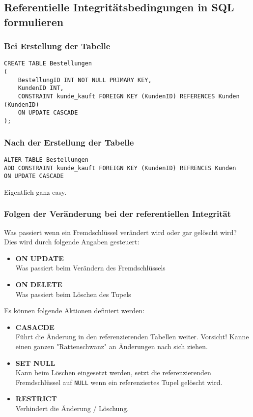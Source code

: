 \subsection{Referentielle Integritätsbedingungen in SQL formulieren}

\subsubsection{Bei Erstellung der Tabelle}
\begin{lstlisting}[caption={Referentielle Integrität bei Erstellung}]
CREATE TABLE Bestellungen
(
    BestellungID INT NOT NULL PRIMARY KEY,
    KundenID INT,
    CONSTRAINT kunde_kauft FOREIGN KEY (KundenID) REFERENCES Kunden (KundenID)
    ON UPDATE CASCADE
);
\end{lstlisting}

\subsubsection{Nach der Erstellung der Tabelle}
\begin{lstlisting}[caption={Referentielle Integrität Update}]
ALTER TABLE Bestellungen
ADD CONSTRAINT kunde_kauft FOREIGN KEY (KundenID) REFRENCES Kunden
ON UPDATE CASCADE
\end{lstlisting}

Eigentlich ganz easy.

\subsubsection{Folgen der Veränderung bei der referentiellen Integrität}
Was passiert wenn ein Fremdschlüssel verändert wird oder gar gelöscht wird? Dies wird durch folgende Angaben gesteuert:

\begin{itemize}
  \item \textbf{ON UPDATE} \\
  Was passiert beim Verändern des Fremdschlüssels
  \item \textbf{ON DELETE} \\
  Was passiert beim Löschen des Tupels
\end{itemize}

\noindent
Es können folgende Aktionen definiert werden:

\begin{itemize}
  \item \textbf{CASACDE} \\
  Führt die Änderung in den referenzierenden Tabellen weiter. Vorsicht! Kanne einen ganzen "Rattenschwanz" an Änderungen nach sich ziehen.
  \item \textbf{SET NULL} \\
  Kann beim Löschen eingesetzt werden, setzt die referenzierenden Fremdschlüssel auf \texttt{NULL} wenn ein referenziertes Tupel gelöscht wird.
  \item \textbf{RESTRICT} \\
  Verhindert die Änderung / Löschung.
\end{itemize}

